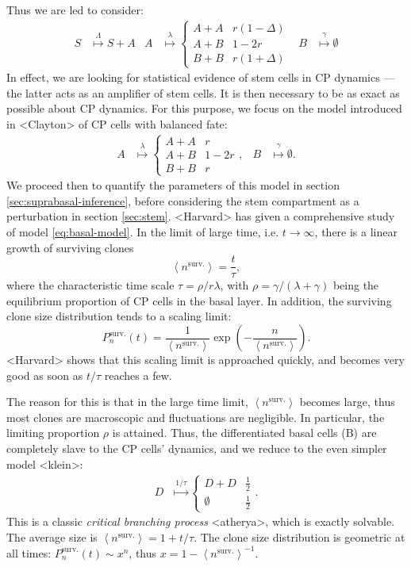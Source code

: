\documentclass[10pt,UKenglish]{article}
\begin{document}
Thus we are led to consider: 
\begin{align}
S &\overset{\Lambda}{\longmapsto} S+A & A &\overset{\lambda}{\longmapsto} \begin{cases}
A+A & r(1-\Delta) \\
A+B & 1-2r \\
B+B & r(1+\Delta)\end{cases} & B &\overset{\gamma}{\longmapsto} \emptyset
\label{eq:full-model}
\end{align}
In effect, we are looking for statistical evidence of stem cells in CP dynamics --- the latter acts as an amplifier of stem cells. It is then necessary to be as exact as possible about CP dynamics. For this purpose, we focus on the model introduced in <Clayton> of CP cells with balanced fate:
\begin{align}
A &\overset{\lambda}{\longmapsto} \begin{cases}
A+A & r \\
A+B & 1-2r \\
B+B & r\end{cases}, & B &\overset{\gamma}{\longmapsto} \emptyset.
\label{eq:basal-model}
\end{align}
We proceed then to quantify the parameters of this model in section \ref{sec:suprabasal-inference}, before considering the stem compartment as a perturbation in section \ref{sec:stem}. <Harvard> has given a comprehensive study of model \ref{eq:basal-model}. In the limit of large time, i.e. $t\rightarrow \infty$, there is a linear growth of surviving clones $$\left\langle n^\textrm{surv.} \right\rangle = \frac{t}{\tau},$$ where the characteristic time scale $\tau = \rho/r\lambda$, with $\rho = \gamma/(\lambda+\gamma)$ being the equilibrium proportion of CP cells in the basal layer. In addition, the surviving clone size distribution tends to a scaling limit: $$P^\textrm{surv.}_n(t) = \frac{1}{\left\langle n^\textrm{surv.} \right\rangle}\exp\left(-\frac{n}{\left\langle n^\textrm{surv.} \right\rangle}\right).$$ <Harvard> shows that this scaling limit is approached quickly, and becomes very good as soon as $t/\tau$ reaches a few.

The reason for this is that in the large time limit, $\left\langle n^\textrm{surv.} \right\rangle$ becomes large, thus most clones are macroscopic and fluctuations are negligible. In particular, the limiting proportion $\rho$ is attained. Thus, the differentiated basal cells (B) are completely slave to the CP cells' dynamics, and we reduce to the even simpler model <klein>: 
\begin{align}
D &\overset{1/\tau}{\longmapsto} \begin{cases}
D+D & \frac{1}{2} \\
\emptyset & \frac{1}{2}\end{cases}\label{eq:simple-balanced-model}.
\end{align}
This is a classic \emph{critical branching process} <atherya>, which is exactly solvable. The average size is $\left\langle n^\textrm{surv.} \right\rangle = 1+t/\tau$. The clone size distribution is geometric at all times: $P^\textrm{surv.}_n(t) \sim x^n$, thus $x = 1 - \left\langle n^\textrm{surv.} \right\rangle^{-1}$.
\end{document}
